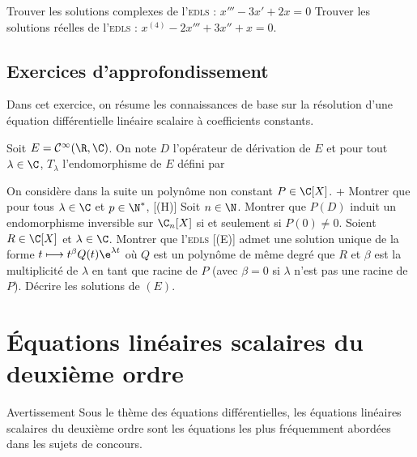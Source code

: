 \begin{exem}
\unite Trouver les solutions complexes de l'\textsc{edls} : $x'''-3x'+2x=0$
\unite Trouver les solutions réelles de l'\textsc{edls} : $x^{(4)}-2x'''+3x''+x=0$.
\end{exem}


\subsection{Exercices d'approfondissement}

\begin{exer}
Dans cet exercice, on résume les connaissances de base sur la résolution d'une équation différentielle linéaire scalaire à coefficients constants.

Soit  $E=\mathcal C^\infty(\R,\C)$. On note $D$ l'opérateur de dérivation de $E$ et pour tout $\lambda\in\C$, $T_\lambda$ l'endomorphisme de $E$ défini par

On considère dans la suite un polynôme non constant $P\in\C[X]$.
\xit+
\xit Montrer que pour tous $\lambda\in\C$ et $p\in\N^*$,
\xit
{}[(H)]
\xit  Soit $n\in\N$. Montrer que $P(D)$ induit un endomorphisme inversible sur $\C_n[X]$ si et seulement si $P(0)\ne0$.
\xit Soient $R\in\C[X]$ et $\lambda\in\C$. Montrer que l'\textsc{edls}
[(E)]
admet une solution unique de la forme $t\longmapsto t^\beta Q(t)\e^{\lambda t}$ où $Q$ est un polynôme de même degré que $R$ et $\beta$ est la multiplicité de $\lambda$ en tant que racine de $P$ (avec $\beta=0$ si $\lambda$ n'est pas une racine de $P$). Décrire les solutions de $(E)$.
\exit
\end{exer}

\section{Équations linéaires scalaires du deuxième ordre}

\begin{genthm}[important=]{Avertissement}
Sous le thème des équations différentielles, les équations linéaires scalaires du deuxième ordre sont les équations les plus fréquemment abordées dans les sujets de concours.
\end{genthm}

